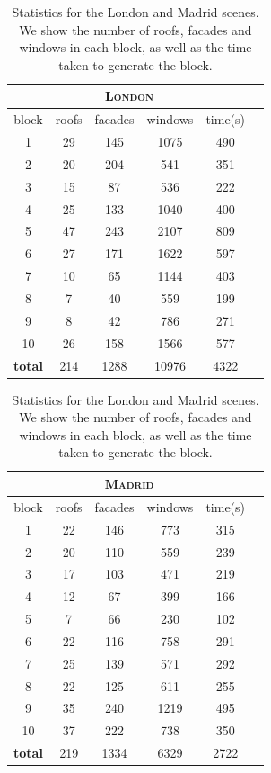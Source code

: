 \begin{table}
\centering

\setlength{\tabcolsep}{1.5pt}

\caption{Statistics for the London and Madrid scenes. We show the number of roofs, facades and windows in each block, as well as the time taken to generate the block.}
\footnotesize
\begin{minipage}{.49\columnwidth}
\begin{tabular}{cccccc}
\multicolumn{5}{c}{\textsc{London}} \\
\hline
block & roofs & facades & windows & time(s) \\
\hline
1 & 29 & 145 & 1075 & 490 \\
2 & 20 & 204 & 541 & 351 \\
3 & 15 & 87 & 536 & 222 \\
4 & 25 & 133 & 1040 & 400 \\
5 & 47 & 243 & 2107 & 809 \\
6 & 27 & 171 & 1622 & 597 \\
7 & 10 & 65 & 1144 & 403 \\
8 & 7 & 40 & 559 & 199 \\
9 & 8 & 42 & 786 & 271 \\
10 & 26 & 158 & 1566 & 577 \\
\hline
\textbf{total} & 214 & 1288 & 10976 & 4322 \\
\hline
\end{tabular} 
\end{minipage}
%
\hfill
%
\begin{minipage}{.49\columnwidth}
\begin{tabular}{cccccc}
\multicolumn{5}{c}{\textsc{Madrid}} \\
\hline
block & roofs & facades & windows & time(s) \\
\hline
1 & 22 & 146 & 773 & 315 \\
2 & 20 & 110 & 559 & 239 \\
3 & 17 & 103 & 471 & 219 \\
4 & 12 & 67 & 399 & 166 \\
5 & 7 & 66 & 230 & 102 \\
6 & 22 & 116 & 758 & 291 \\
7 & 25 & 139 & 571 & 292 \\
8 & 22 & 125 & 611 & 255 \\
9 & 35 & 240 & 1219 & 495 \\
10 & 37 & 222 & 738 & 350 \\
\hline
\textbf{total} & 219 & 1334 & 6329 & 2722 \\
\hline
\end{tabular}
\end{minipage}

\vspace{-5pt}

\label{table:scene_statistics}
\end{table}


